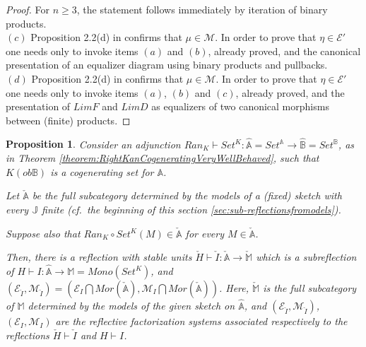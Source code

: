 \documentclass[12pt,a4paper]{amsart}
\newtheorem{proposition}{Proposition}[section]
\theoremstyle{definition}
\begin{document}
\begin{proof}

For $n\geq 3$, the statement follows immediately by iteration of binary products.\\

$(c)$ Proposition 2.2(d) in \cite{CJKP:stab} confirms that $\mu\in\mathcal{M}$. In order to prove that $\eta\in\mathcal{E}'$ one needs only to invoke items $(a)$ and $(b)$, already proved, and the canonical presentation of an equalizer diagram using binary products and pullbacks.\\

$(d)$ Proposition 2.2(d) in \cite{CJKP:stab} confirms that $\mu\in\mathcal{M}$. In order to prove that $\eta\in\mathcal{E}'$ one needs only to invoke items $(a)$, $(b)$ and $(c)$, already proved, and the presentation of $LimF$ and $LimD$ as equalizers of two canonical morphisms between (finite) products.\end{proof}

\begin{proposition}\label{proposition:stableunitsModelsPresheaves}
Consider an adjunction $Ran_K\vdash Set^K:\hat{\mathbb{A}}=Set^{\mathbb{A}}\rightarrow \hat{\mathbb{B}}=Set^\mathbb{B}$, as in Theorem \ref{theorem:RightKanCogeneratingVeryWellBehaved}, such that $K(ob\mathbb{B})$ is a cogenerating set for $\mathbb{A}$.

Let $\check{\mathbb{A}}$ be the full subcategory determined by the models of a (fixed) sketch with every $\mathbb{J}$ finite (cf.\ the beginning of this section \ref{sec:sub-reflectionsfromodels}).

Suppose also that $Ran_K\circ Set^K(M)\in \check{\mathbb{A}}$ for every $M\in\check{\mathbb{A}}$.

Then, there is a reflection with stable units $\check{H}\vdash \check{I}:\check{\mathbb{A}}\rightarrow\check{\mathbb{M}}$ which is a subreflection of $H\vdash I:\hat{\mathbb{A}}\rightarrow\mathbb{M}=Mono(Set^K)$, and $(\mathcal{E}_{\check{I}},\mathcal{M}_{\check{I}})=(\mathcal{E}_I\bigcap Mor(\check{\mathbb{A}}),\mathcal{M}_I\bigcap Mor(\check{\mathbb{A}}))$. Here, $\check{\mathbb{M}}$ is the full subcategory of $\mathbb{M}$ determined by the models of the given sketch on $\hat{\mathbb{A}}$, and $(\mathcal{E}_{\check{I}},\mathcal{M}_{\check{I}})$, $(\mathcal{E}_I,\mathcal{M}_I)$ are the reflective factorization systems associated respectively to the reflections $\check{H}\vdash \check{I}$ and $H\vdash I$.
\end{proposition}
\end{document}
